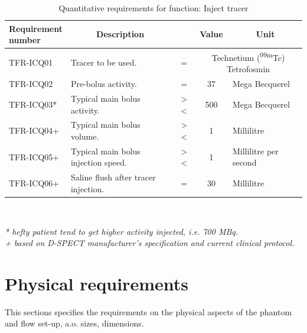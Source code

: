 \begin{table}[H]
\caption{Quantitative requirements for function: Inject tracer}
\label{tab:injtrac_quan}
\begin{tabular}{l|p{65mm}ccp{20mm}|}
	\makecell[l]{\textbf{Requirement} \\  \textbf{number}} & \multicolumn{1}{c}{\textbf{Description}} & \multicolumn{1}{c}{ } & \multicolumn{1}{c}{\textbf{Value}} & \multicolumn{1}{c}{\textbf{Unit}} \\
	\hline
	TFR-ICQ01 	& Tracer to be used. 					& = 			& \multicolumn{2}{p{35mm}|}{Technetium (\textsuperscript{99m}Tc) Tetrofosmin} \\
	TFR-ICQ02 	& Pre-bolus activity.					& = 			& 37				& Mega Becquerel \\
	TFR-ICQ03*	& Typical main bolus activity.		 	& > \spacing < 	& 500 \spacing 700 	& Mega Becquerel \\
	TFR-ICQ04+	& Typical main bolus volume. 			& > \spacing <	& 1 \spacing 2 		& Millilitre \\
	TFR-ICQ05+	& Typical main bolus injection speed.	& > \spacing < 	& 1 \spacing 2		& Millilitre per second \\
	TFR-ICQ06+	& Saline flush after tracer injection.	& =				& 30				& Millilitre \\
	\cline{2-5}
\end{tabular} \\
\raggedright
\textit{* hefty patient tend to get higher activity injected, i.e. 700 MBq.} \\
\textit{+ based on D-SPECT manufacturer's specification and current clinical protocol.}
\end{table}

\section{Physical requirements}
\label{sec:phys_req}
This sections specifies the requirements on the physical aspects of the phantom and flow set-up, a.o. sizes, dimensions.

